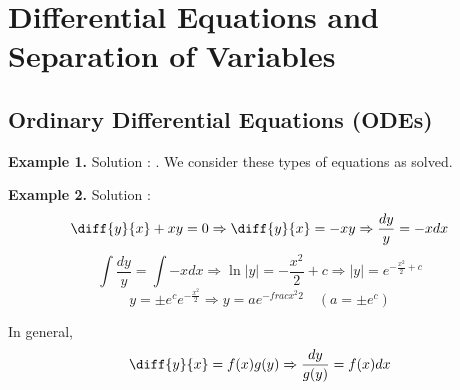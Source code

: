

\chapter{Differential Equations and Separation of Variables}
\bigbreak

\section{Ordinary Differential Equations (ODEs) }

{\bf Example 1.} 
\bigbreak
Solution : . We consider these types of equations as solved.
\bigbreak


{\bf Example 2.} 
\bigbreak
Solution :
$$
	\diff{y}{x} + xy = 0 \Rightarrow
	\diff{y}{x} = -xy \Rightarrow
	\frac{dy}{y} = -xdx
$$
$$
	\int \frac{dy}{y} = \int -xdx \Rightarrow
	\ln|y| = -\frac{x^2}{2} + c \Rightarrow
	|y| = e^{-\frac{x^2}{2} + c}
$$
$$
	y = \pm e^c e^{-\frac{x^2}{2}} \Rightarrow
	y = ae^{-frac{x^2}{2}} \quad (a = \pm e^c)
$$


In general,
$$
\diff{y}{x} = f(x)g(y) \Rightarrow
\frac{dy}{g(y)} = f(x)dx
$$